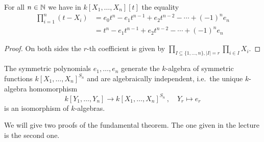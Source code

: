\begin{lemma}
  \label{lemma: natural occurence of elementary symmetric polynomials}
  For all $n \in \mathbb{N}$ we have in $k[X_1, \dotsc, X_n][t]$ the equality
  \begin{align*}
        \prod_{i=1}^n (t-X_i)
    &=    e_0 t^n
        - e_1 t^{n-1}
        + e_2 t^{n-2}
        - \dotsb
        + (-1)^n e_n  \\
    &=    t^n
        - e_1 t^{n-1}
        + e_2 t^{n-2}
        - \dotsb
        + (-1)^n e_n
  \end{align*}
\end{lemma}
\begin{proof}
  On both sides the $r$-th coefficient is given by $\prod_{I \subseteq \{1, \dotsc, n\}, |I| = r} \prod_{i \in I} X_i $.
\end{proof}


\begin{theorem}
  The symmetric polynomials $e_1, \dotsc, e_n$ generate the $k$-algebra of symmetric functions $k[X_1, \dotsc, X_n]^{S_n}$ and are algebraically independent, i.e.\ the unique $k$-algebra homomorphism
  \[
            k[Y_1, \dotsc, Y_n]
    \to     k[X_1, \dotsc, X_n]^{S_n} \,,
    \quad   Y_r
    \mapsto e_r
  \]
  is an isomorphism of $k$-algebras.
\end{theorem}


\begin{fluff}
  We will give two proofs of the fundamental theorem.
  The one given in the lecture is the second one.
\end{fluff}



